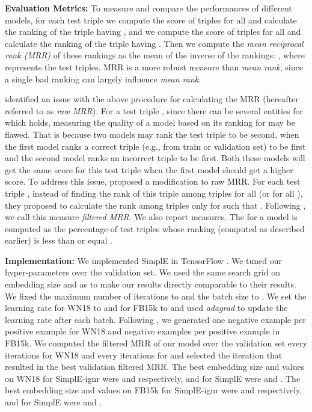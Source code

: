 \documentclass{article}
\begin{document}
\textbf{Evaluation Metrics:} To measure and compare the performances of different models, for each test triple  we compute the score of  triples for all  and calculate the ranking  of the triple having , and we compute the score of  triples for all  and calculate the ranking  of the triple having . Then we compute the \emph{mean reciprocal rank (MRR)} of these rankings as the mean of the inverse of the rankings:
,
where  represents the test triples. MRR is a more robust measure than \emph{mean rank}, since a single bad ranking can largely influence \emph{mean rank}.

\citet{bordes2013translating} identified an issue with the above procedure for calculating the MRR (hereafter referred to as \emph{raw MRR}). For a test triple , since there can be several entities  for which  holds, measuring the quality of a model based on its ranking for  may be flawed. That is because two models may rank the test triple  to be second, when the first model ranks a correct triple (e.g., from train or validation set)  to be first and the second model ranks an incorrect triple  to be first. Both these models will get the same score for this test triple when the first model should get a higher score.
To address this issue, \cite{bordes2013translating} proposed a modification to raw MRR. For each test triple , instead of finding the rank of this triple among triples  for all  (or  for all ), they proposed to calculate the rank among triples  only for  such that . Following \cite{bordes2013translating}, we call this measure \emph{filtered MRR}. 
We also report  measures. The  for a model is computed as the percentage of test triples whose ranking (computed as described earlier) is less than or equal .

\textbf{Implementation:} We implemented SimplE in TensorFlow \cite{TensorFlow}. We tuned our hyper-parameters over the validation set. We used the same search grid on embedding size and  as \cite{trouillon2016complex} to make our results directly comparable to their results. We fixed the maximum number of iterations to  and the batch size to . We set the learning rate for WN18 to  and for FB15k to  and used \emph{adagrad} to update the learning rate after each batch. Following \cite{trouillon2016complex}, we generated one negative example per positive example for WN18 and  negative examples per positive example in FB15k. We computed the filtered MRR of our model over the validation set every  iterations for WN18 and every  iterations for  and selected the iteration that resulted in the best validation filtered MRR. The best embedding size and  values on WN18 for SimplE-ignr were  and  respectively, and for SimplE were  and . The best embedding size and  values on FB15k for SimplE-ignr were  and  respectively, and for SimplE were  and .
\end{document}
